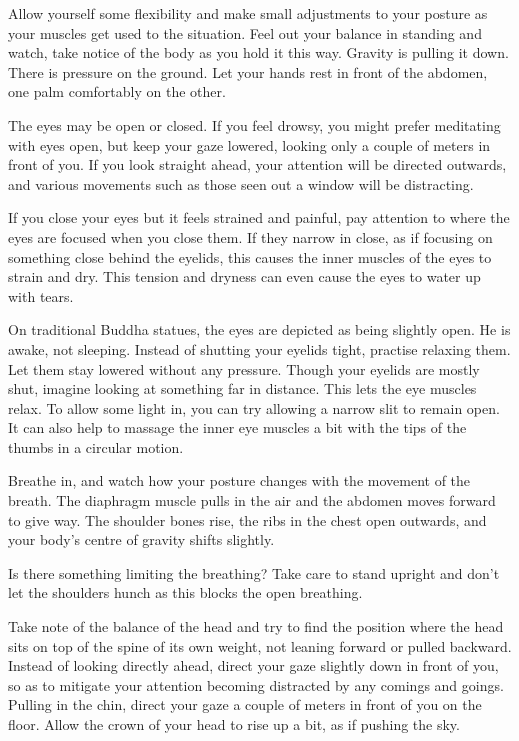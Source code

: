 Allow yourself some flexibility and make small adjustments to your
posture as your muscles get used to the situation. Feel out your balance
in standing and watch, take notice of the body as you hold it this way.
Gravity is pulling it down. There is pressure on the ground. Let your
hands rest in front of the abdomen, one palm comfortably on the other.

The eyes may be open or closed. If you feel drowsy, you might prefer
meditating with eyes open, but keep your gaze lowered, looking only a
couple of meters in front of you. If you look straight ahead, your
attention will be directed outwards, and various movements such as those
seen out a window will be distracting.

If you close your eyes but it feels strained and painful, pay attention
to where the eyes are focused when you close them. If they narrow in
close, as if focusing on something close behind the eyelids, this causes
the inner muscles of the eyes to strain and dry. This tension and
dryness can even cause the eyes to water up with tears.

On traditional Buddha statues, the eyes are depicted as being slightly
open. He is awake, not sleeping. Instead of shutting your eyelids tight,
practise relaxing them. Let them stay lowered without any pressure.
Though your eyelids are mostly shut, imagine looking at something far in
distance. This lets the eye muscles relax. To allow some light in, you
can try allowing a narrow slit to remain open. It can also help to
massage the inner eye muscles a bit with the tips of the thumbs in a
circular motion.

Breathe in, and watch how your posture changes with the movement of the
breath. The diaphragm muscle pulls in the air and the abdomen moves
forward to give way. The shoulder bones rise, the ribs in the chest open
outwards, and your body's centre of gravity shifts slightly.

\enlargethispage*{\baselineskip}

Is there something limiting the breathing? Take care to stand upright
and don't let the shoulders hunch as this blocks the open breathing.

Take note of the balance of the head and try to find the position where
the head sits on top of the spine of its own weight, not leaning forward
or pulled backward. Instead of looking directly ahead, direct your gaze
slightly down in front of you, so as to mitigate your attention becoming
distracted by any comings and goings. Pulling in the chin, direct your
gaze a couple of meters in front of you on the floor. Allow the crown of
your head to rise up a bit, as if pushing the sky.

